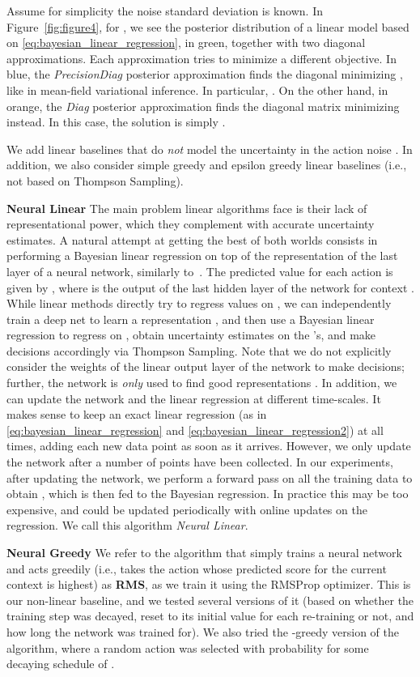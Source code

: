 \documentclass{article} \usepackage{iclr2018_conference,times}
\begin{document}
Assume for simplicity the noise standard deviation is known.
In Figure~\ref{fig:figure4}, for , we see the posterior distribution  of a linear model based on \eqref{eq:bayesian_linear_regression}, in green, together with two diagonal approximations.
Each approximation tries to minimize a different objective.
In blue, the \emph{PrecisionDiag} posterior approximation finds the diagonal  minimizing , like in mean-field variational inference. In particular, .
On the other hand, in orange, the \emph{Diag} posterior approximation finds the diagonal matrix  minimizing  instead.
In this case, the solution is simply .

We add linear baselines that do \emph{not} model the uncertainty in the action noise .
In addition, we also consider simple greedy and epsilon greedy linear baselines (i.e., not based on Thompson Sampling).

\textbf{Neural Linear}
The main problem linear algorithms face is their lack of representational power, which they complement with accurate uncertainty estimates.
A natural attempt at getting the best of both worlds consists in performing a Bayesian linear regression on top of the representation of the last layer of a neural network, similarly to~\cite{snoek2015}.
The predicted value  for each action  is given by , where  is the output of the last hidden layer of the network for context .
While linear methods directly try to regress values  on , we can independently train a deep net to learn a representation , and then use a Bayesian linear regression to regress  on , obtain uncertainty estimates on the 's, and make decisions accordingly via Thompson Sampling.
Note that we do not explicitly consider the weights of the linear output layer of the network to make decisions; further, the network is \emph{only} used to find good representations .
In addition, we can update the network and the linear regression at different time-scales.
It makes sense to keep an exact linear regression (as in \eqref{eq:bayesian_linear_regression} and \eqref{eq:bayesian_linear_regression2}) at all times, adding each new data point as soon as it arrives.
However, we only update the network after a number of points have been collected.
In our experiments, after updating the network, we perform a forward pass on all the training data to obtain , which is then fed to the Bayesian regression.
In practice this may be too expensive, and  could be updated periodically with online updates on the regression.
We call this algorithm \emph{Neural Linear}.

\textbf{Neural Greedy}
We refer to the algorithm that simply trains a neural network and acts greedily (i.e., takes the action whose predicted score for the current context is highest) as \textbf{RMS}, as we train it using the RMSProp optimizer.
This is our non-linear baseline, and we tested several versions of it (based on whether the training step was decayed, reset to its initial value for each re-training or not, and how long the network was trained for).
We also tried the -greedy version of the algorithm, where a random action was selected with probability  for some decaying schedule of .
\end{document}
